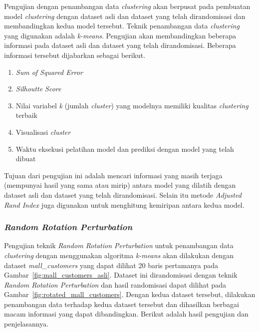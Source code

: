 Pengujian dengan penambangan data \textit{clustering} akan berpusat pada pembuatan model \textit{clustering} dengan dataset asli dan dataset yang telah dirandomisasi dan membandingkan kedua model tersebut. Teknik penambangan data \textit{clustering} yang digunakan adalah \textit{k-means}. Pengujian akan membandingkan beberapa informasi pada dataset asli dan dataset yang telah dirandomisasi. Beberapa informasi tersebut dijabarkan sebagai berikut.
\begin{enumerate}
	\item \textit{Sum of Squared Error}
	\item \textit{Silhoutte Score}
	\item Nilai variabel \textit{k} (jumlah \textit{cluster}) yang modelnya memiliki kualitas \textit{clustering} terbaik
	\item Visualisasi \textit{cluster}
	\item Waktu eksekusi pelatihan model dan prediksi dengan model yang telah dibuat
\end{enumerate}
Tujuan dari pengujian ini adalah mencari informasi yang masih terjaga (mempunyai hasil yang sama atau mirip) antara model yang dilatih dengan dataset asli dan dataset yang telah dirandomisasi. Selain itu metode \textit{Adjusted Rand Index} juga digunakan untuk menghitung kemiripan antara kedua model.

\subsubsection{\textit{Random Rotation Perturbation}}
\label{subsubsec:pengujian-clustering-rrp}

Pengujian teknik \textit{Random Rotation Perturbation} untuk penambangan data \textit{clustering} dengan menggunakan algoritma \textit{k-means} akan dilakukan dengan dataset \textit{mall\_customers} yang dapat dilihat 20 baris pertamanya pada Gambar~\ref{fig:mall_customers_asli}. Dataset ini dirandomisasi dengan teknik \textit{Random Rotation Perturbation} dan hasil randomisasi dapat dilihat pada Gambar~\ref{fig:rotated_mall_customers}. Dengan kedua dataset tersebut, dilakukan penambangan data terhadap kedua dataset tersebut dan dihasilkan berbagai macam informasi yang dapat dibandingkan. Berikut adalah hasil pengujian dan penjelasannya.

